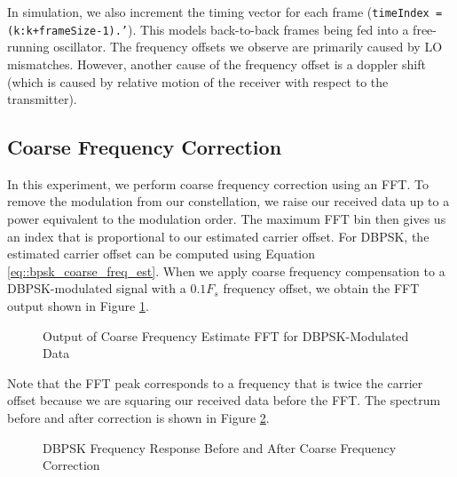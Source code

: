 \documentclass{article}
\begin{document}
	In simulation, we also increment the timing vector for each frame (\texttt{timeIndex = (k:k+frameSize-1).'}). This models back-to-back frames being fed into a free-running oscillator. The frequency offsets we observe are primarily caused by LO mismatches. However, another cause of the frequency offset is a doppler shift (which is caused by relative motion of the receiver with respect to the transmitter).

\subsection{Coarse Frequency Correction}

In this experiment, we perform coarse frequency correction using an FFT. To remove the modulation from our constellation, we raise our received data up to a power equivalent to the modulation order. The maximum FFT bin then gives us an index that is proportional to our estimated carrier offset. For DBPSK, the estimated carrier offset can be computed using Equation \ref{eq::bpsk_coarse_freq_est}. When we apply coarse frequency compensation to a DBPSK-modulated signal with a $0.1F_s$ frequency offset, we obtain the FFT output shown in Figure \ref{fig::bpsk_coarse_freq_estimate}.

\begin{figure}[H]
	\centerline{}
	\caption{Output of Coarse Frequency Estimate FFT for DBPSK-Modulated Data}
	\label{fig::bpsk_coarse_freq_estimate}
\end{figure}

\noindent Note that the FFT peak corresponds to a frequency that is twice the carrier offset because we are squaring our received data before the FFT. The spectrum before and after correction is shown in Figure \ref{fig::psd_bpsk_with_cfc}.

\begin{figure}[H]
	\centerline{}
	\caption{DBPSK Frequency Response Before and After Coarse Frequency Correction}
	\label{fig::psd_bpsk_with_cfc}
\end{figure}
\end{document}
